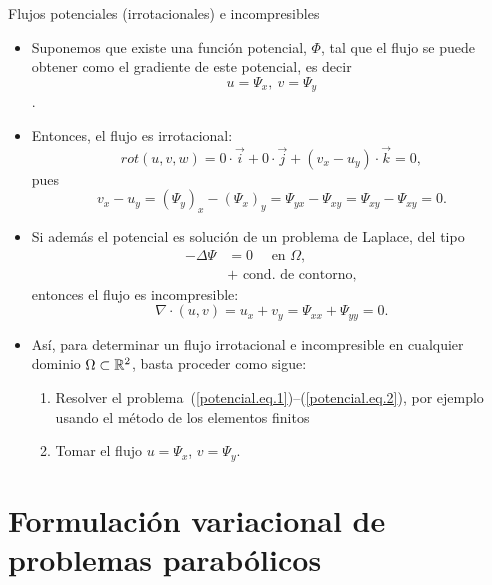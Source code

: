 \documentclass[9pt, dvipsnames,]{beamer}
\begin{document}
\begin{frame}{Flujos potenciales (irrotacionales) e incompresibles}
\begin{itemize}
\item Suponemos que existe una función potencial, $\Phi$, tal que
  el flujo se puede obtener como el gradiente de este potencial, es decir
  $$u=\Psi_x, \ v=\Psi_y$$.
  \item Entonces, el flujo es \alert{irrotacional}:
  $$
  rot(u,v,w) = 0\cdot \vec{i} + 0\cdot \vec j + (v_x - u_y)\cdot \vec k = 0,
  $$
  pues
  $$
  v_x - u_y = (\Psi_{y})_x - (\Psi_{x})_y = \Psi_{yx} - \Psi_{xy} = \Psi_{xy} - \Psi_{xy} = 0.
  $$
\item Si además el potencial es solución de un problema de Laplace, del tipo
  \begin{align}
    \label{potencial.eq.1}
    -\Delta \Psi &= 0 \quad \text{ en } \Omega, \\
    \label{potencial.eq.2}
    &+ \text{ cond. de contorno},
  \end{align}
  entonces el flujo es \alert{incompresible}:
  $$
  \nabla\cdot(u,v) = u_x + v_y =\Psi_{xx} + \Psi_{yy} =  0.
  $$
\item Así, para determinar un flujo irrotacional e incompresible en
  cualquier dominio $\Omega\subset{\mathbb R}^2$, basta proceder como sigue:
  \begin{enumerate}
  \item Resolver el
    problema~(\ref{potencial.eq.1})--(\ref{potencial.eq.2}), por
    ejemplo usando el método de los elementos finitos
  \item Tomar el flujo $u=\Psi_x$, $v=\Psi_y$.
  \end{enumerate}


\end{itemize}

\end{frame}

\section{Formulación variacional de problemas parabólicos}
\end{document}
